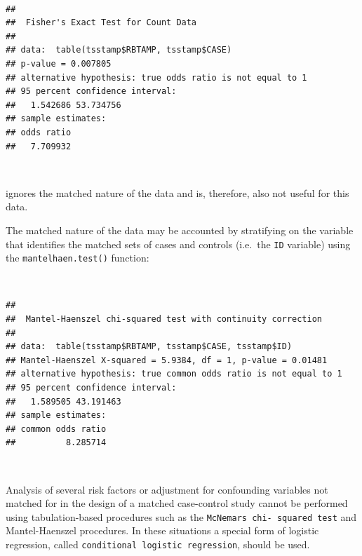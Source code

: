\documentclass[12pt,a4paper]{book}
\newenvironment{Shaded}{\begin{snugshade}}{\end{snugshade}}
\newcommand{\KeywordTok}[1]{\textcolor[rgb]{0.13,0.29,0.53}{\textbf{#1}}}
\newcommand{\OperatorTok}[1]{\textcolor[rgb]{0.81,0.36,0.00}{\textbf{#1}}}
\newcommand{\NormalTok}[1]{#1}
\theoremstyle{definition}
\theoremstyle{definition}
\theoremstyle{definition}
\theoremstyle{remark}
\begin{document}
~

\begin{Shaded}
\end{Shaded}

\begin{verbatim}
## 
##  Fisher's Exact Test for Count Data
## 
## data:  table(tsstamp$RBTAMP, tsstamp$CASE)
## p-value = 0.007805
## alternative hypothesis: true odds ratio is not equal to 1
## 95 percent confidence interval:
##   1.542686 53.734756
## sample estimates:
## odds ratio 
##   7.709932
\end{verbatim}

~

ignores the matched nature of the data and is, therefore, also not
useful for this data.

The matched nature of the data may be accounted by stratifying on the
variable that identifies the matched sets of cases and controls
(i.e.~the \texttt{ID} variable) using the \texttt{mantelhaen.test()}
function:

~

\begin{Shaded}
\end{Shaded}

\begin{verbatim}
## 
##  Mantel-Haenszel chi-squared test with continuity correction
## 
## data:  table(tsstamp$RBTAMP, tsstamp$CASE, tsstamp$ID)
## Mantel-Haenszel X-squared = 5.9384, df = 1, p-value = 0.01481
## alternative hypothesis: true common odds ratio is not equal to 1
## 95 percent confidence interval:
##   1.589505 43.191463
## sample estimates:
## common odds ratio 
##          8.285714
\end{verbatim}

~

Analysis of several risk factors or adjustment for confounding variables
not matched for in the design of a matched case-control study cannot be
performed using tabulation-based procedures such as the
\texttt{McNemar\textquotesingle{}s\ chi-\ squared\ test} and
Mantel-Haenszel procedures. In these situations a special form of
logistic regression, called \texttt{conditional\ logistic\ regression},
should be used.
\end{document}
